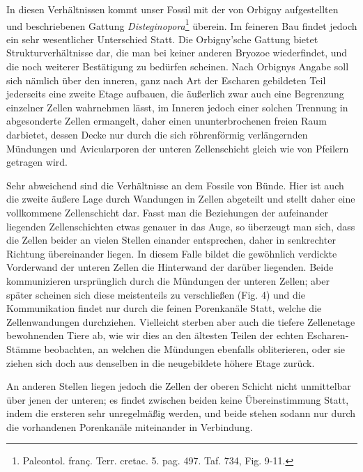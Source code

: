 \documentclass[a4paper, 11pt, oneside, german]{article}
\begin{document}
In diesen Verhältnissen kommt unser Fossil mit der von Orbigny aufgestellten und beschriebenen Gattung \emph{Disteginopora}\footnote{Paleontol. franç. Terr. cretac. 5. pag. 497. Taf. 734, Fig. 9-11.} überein. Im feineren Bau findet jedoch ein sehr wesentlicher Unterschied Statt. Die Orbigny'sche Gattung bietet Strukturverhältnisse dar, die man bei keiner anderen Bryozoe wiederfindet, und die noch weiterer Bestätigung zu bedürfen scheinen. Nach Orbignys Angabe soll sich nämlich über den inneren, ganz nach Art der Escharen gebildeten Teil jederseits eine zweite Etage aufbauen, die äußerlich zwar auch eine Begrenzung einzelner Zellen wahrnehmen lässt, im Inneren jedoch einer solchen Trennung in abgesonderte Zellen ermangelt, daher einen ununterbrochenen freien Raum darbietet, dessen Decke nur durch die sich röhrenförmig verlängernden Mündungen und Avicularporen der unteren Zellenschicht gleich wie von Pfeilern getragen wird.

Sehr abweichend sind die Verhältnisse an dem Fossile von Bünde. Hier ist auch die zweite äußere Lage durch Wandungen in Zellen abgeteilt und stellt daher eine vollkommene Zellenschicht dar. Fasst man die Beziehungen der aufeinander liegenden Zellenschichten etwas genauer in das Auge, so überzeugt man sich, dass die Zellen beider an vielen Stellen einander entsprechen, daher in senkrechter Richtung übereinander liegen. In diesem Falle bildet die gewöhnlich verdickte Vorderwand der unteren Zellen die Hinterwand der darüber liegenden. Beide kommunizieren ursprünglich durch die Mündungen der unteren Zellen; aber später scheinen sich diese meistenteils zu verschließen (Fig. 4) und die Kommunikation findet nur durch die feinen Porenkanäle Statt, welche die Zellenwandungen durchziehen. Vielleicht sterben aber auch die tiefere Zellenetage bewohnenden Tiere ab, wie wir dies an den ältesten Teilen der echten Escharen-Stämme beobachten, an welchen die Mündungen ebenfalls obliterieren, oder sie ziehen sich doch aus denselben in die neugebildete höhere Etage zurück.

An anderen Stellen liegen jedoch die Zellen der oberen Schicht nicht unmittelbar über jenen der unteren; es findet zwischen beiden keine Übereinstimmung Statt, indem die ersteren sehr unregelmäßig werden, und beide stehen sodann nur durch die vorhandenen Porenkanäle miteinander in Verbindung.
\end{document}
